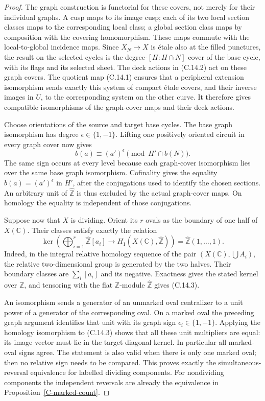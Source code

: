 \begin{proof}
The graph construction is functorial for these covers, not merely
for their individual graphs. A cusp maps to its image cusp; each
of its two local section classes maps to the corresponding local
class; a global section class maps by composition with the covering
homomorphism. These maps commute with the local-to-global incidence
maps. Since $X_N\to X$ is \'etale also at the filled punctures,
the result on the selected cycles is the degree-$[H:H\cap N]$
cover of the base cycle, with its flags and its selected sheet.
The deck actions in (C.14.2) act on these graph covers. The quotient
map (C.14.1) ensures that a peripheral extension isomorphism sends
exactly this system of compact \'etale covers, and their inverse
images in $U$, to the corresponding system on the other curve.
It therefore gives compatible isomorphisms of the graph-cover
maps and their deck actions.

Choose orientations of the source and target base cycles. The
base graph isomorphism has degree $\epsilon\in\{1,-1\}$. Lifting
one positively oriented circuit in every graph cover now gives
\[
 b(a)\equiv (a')^{\epsilon}\pmod {H'\cap b(N)}.
\]
The same sign occurs at every level because each graph-cover
isomorphism lies over the same base graph isomorphism. Cofinality
gives the equality $b(a)=(a')^{\epsilon}$ in $H'$, after the
conjugations used to identify the chosen sections. An arbitrary
unit of $\widehat{\mathbb Z}$ is thus excluded by the actual
graph-cover maps. On homology the equality is independent of
those conjugations.

Suppose now that $X$ is dividing. Orient its $r$ ovals as the
boundary of one half of $X(\mathbb C)$. Their classes satisfy
exactly the relation
\[
 \ker\left(\bigoplus_{i=1}^r\widehat{\mathbb Z}[a_i]
      \longrightarrow H_1(X(\mathbb C),\widehat{\mathbb Z})\right)
     =\widehat{\mathbb Z}(1,\ldots,1).
\tag{C.14.3}
\]
Indeed, in the integral relative homology sequence of the pair
$(X(\mathbb C),\bigcup A_i)$, the relative two-dimensional group
is generated by the two halves. Their boundary classes are
$\sum_i[a_i]$ and its negative. Exactness gives the stated
kernel over $\mathbb Z$, and tensoring with the flat
$\mathbb Z$-module $\widehat{\mathbb Z}$ gives (C.14.3).

An isomorphism sends a generator of an unmarked oval centralizer
to a unit power of a generator of the corresponding oval. On a
marked oval the preceding graph argument identifies that unit
with its graph sign $\epsilon_i\in\{1,-1\}$. Applying the
homology isomorphism to (C.14.3) shows that all these unit
multipliers are equal: its image vector must lie in the target
diagonal kernel. In particular all marked-oval signs agree.
The statement is also valid when there is only one marked oval;
then no relative sign needs to be compared. This proves exactly
the simultaneous-reversal equivalence for labelled dividing
components. For nondividing components the independent reversals
are already the equivalence in
Proposition~\ref{C-marked-count}.


\end{proof}
